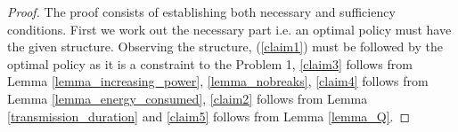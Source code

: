 \begin{proof}

%


The proof consists of establishing both necessary and sufficiency conditions. First we work out the necessary part i.e. an optimal policy must have the given structure. Observing the structure, (\ref{claim1}) must be followed by the optimal policy as it is a constraint to the Problem 1, \eqref{claim3} follows from Lemma \ref{lemma_increasing_power}, \ref{lemma_nobreaks}, \eqref{claim4} follows from Lemma \ref{lemma_energy_consumed}, \eqref{claim2} follows from Lemma \ref{transmission_duration} and \eqref{claim5} follows from Lemma \ref{lemma_Q}.




\end{proof}
